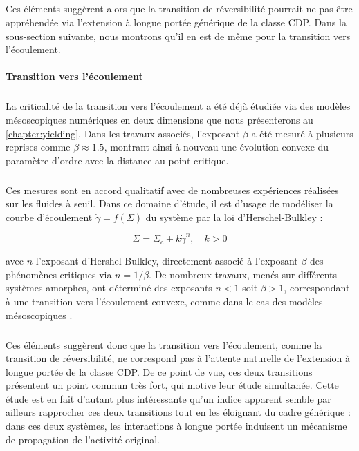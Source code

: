 \subparagraph{}Ces éléments suggèrent alors que la transition de réversibilité pourrait ne pas être appréhendée via l'extension à longue portée générique de la classe CDP. Dans la sous-section suivante, nous montrons qu'il en est de même pour la transition vers l'écoulement.

\paragraph{Transition vers l'écoulement}

\subparagraph{}La criticalité de la transition vers l'écoulement a été déjà étudiée via des modèles mésoscopiques numériques en deux dimensions que nous présenterons au \autoref{chapter:yielding}\cite{lin_scaling_2014, liu_driving_2016, ferrero_criticality_2019, picard_slow_2005}. Dans les travaux associés, l'exposant $\beta$ a été mesuré à plusieurs reprises comme $\beta\approx 1.5$, montrant ainsi à nouveau une évolution convexe du paramètre d'ordre avec la distance au point critique.

\subparagraph{}Ces mesures sont en accord qualitatif avec de nombreuses expériences réalisées sur les fluides à seuil. Dans ce domaine d'étude, il est d'usage de modéliser la courbe d'écoulement $\dot{\gamma} = f(\Sigma)$ du système par la loi d'Herschel-Bulkley :

\begin{equation}
	\Sigma = \Sigma_c + k\dot{\gamma}^n, \quad k > 0
\end{equation}

\noindent avec $n$ l'exposant d'Hershel-Bulkley, directement associé à l'exposant $\beta$ des phénomènes critiques via $n=1/\beta$. De nombreux travaux, menés sur différents systèmes amorphes, ont déterminé des exposants $n<1$ soit $\beta > 1$, correspondant à une transition vers l'écoulement convexe, comme dans le cas des modèles mésoscopiques \cite{nicolas_deformation_2018}.

\subparagraph{}Ces éléments suggèrent donc que la transition vers l'écoulement, comme la transition de réversibilité, ne correspond pas à l'attente naturelle de l'extension à longue portée de la classe CDP. De ce point de vue, ces deux transitions présentent un point commun très fort, qui motive leur étude simultanée. Cette étude est en fait d'autant plus intéressante qu'un indice apparent semble par ailleurs rapprocher ces deux transitions tout en les éloignant du cadre générique : dans ces deux systèmes, les interactions à longue portée induisent un mécanisme de propagation de l'activité original.

